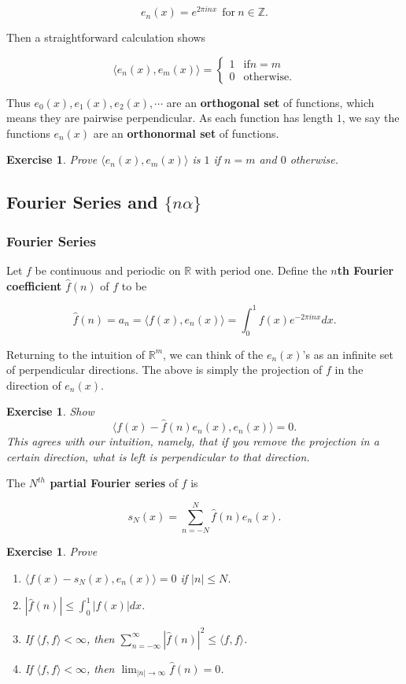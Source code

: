 \documentclass[12pt,letterpaper]{report}
\newcommand\be{\begin{equation}}
\newcommand\ee{\end{equation}}
\newcommand\ben{\begin{enumerate}}
\newcommand\een{\end{enumerate}}
\newcommand{\tbf}[1]{\textbf{#1}}
\newcommand{\R}{\ensuremath{\mathbb{R}}}
\newcommand{\Z}{\ensuremath{\mathbb{Z}}}
\newtheorem{exe}[thm]{Exercise}
\begin{document}
\be e_n(x) = e^{2\pi i n x} \ \ \mbox{for} \ n \in \Z.\ee

Then a straightforward calculation shows

\be \langle e_n(x),e_m(x)\rangle = \begin{cases} 1 & \text{if
$n=m$}\\ 0 &\text{otherwise.}\end{cases}\ee

Thus $e_0(x), e_1(x), e_2(x),\dotsb$ are an \tbf{orthogonal set}
of functions, which means they are pairwise perpendicular. As each
function has length $1$, we say the functions $e_n(x)$ are an
\tbf{orthonormal set} of functions.

\begin{exe} Prove $\langle e_n(x),e_m(x)\rangle$ is $1$ if $n=m$
and $0$ otherwise. \end{exe}


\subsection{Fourier Series and $\{n \alpha \}$ }

\subsubsection{Fourier Series} Let $f$ be continuous and periodic
on $\mathbb{R}$ with period one. Define the \tbf{$n$th Fourier
coefficient} $\hat{f}(n)$ of $f$ to be

\be \hat{f}(n) = a_n = \langle f(x),e_n(x)\rangle = \int_0^1 f(x)
e^{-2\pi i n x} d x .\ee

Returning to the intuition of $\R^m$, we can think of the
$e_n(x)$'s as an infinite set of perpendicular directions. The
above is simply the projection of $f$ in the direction of
$e_n(x)$.

\begin{exe} Show
\be \langle f(x) - \hat{f}(n) e_n(x), e_n(x)\rangle = 0 .\ee This
agrees with our intuition, namely, that if you remove the
projection in a certain direction, what is left is perpendicular
to that direction.
\end{exe}

The \tbf{$N^{th}$ partial Fourier series} of $f$ is

\be s_N(x) = \sum_{n=-N}^N \hat{f}(n) e_n(x) .\ee

\begin{exe} Prove
\ben
\item $\langle f(x) - s_N(x), e_n(x)\rangle = 0$ if $|n| \le N$.
\item $|\hat{f}(n)| \le \int_0^1 |f(x)|dx$.
\item If $\langle f,f \rangle < \infty$, then
$\sum_{n=-\infty}^\infty |\hat{f}(n)|^2 \le \langle f,f \rangle$.
\item If $\langle f,f \rangle < \infty$, then $\lim_{|n|
\rightarrow \infty} \hat{f}(n) = 0$. \een
\end{exe}
\end{document}
